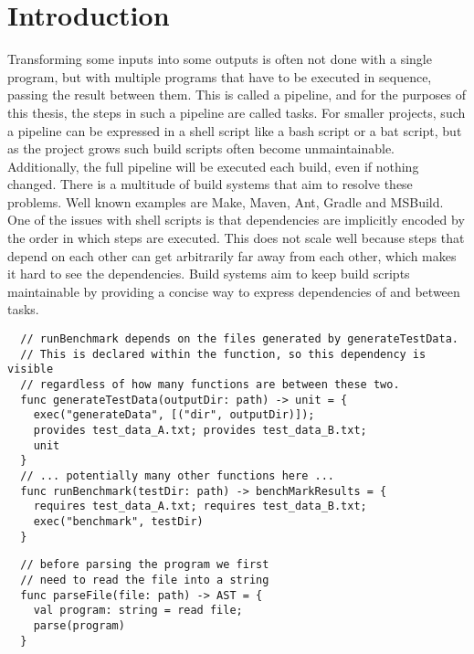 
\section{Introduction}
\label{sec:introduction}

Transforming some inputs into some outputs is often not done with a single program, but with multiple programs that have to be executed in sequence, passing the result between them.
This is called a pipeline, and for the purposes of this thesis, the steps in such a pipeline are called tasks.
For smaller projects, such a pipeline can be expressed in a shell script like a bash script or a bat script, but as the project grows such build scripts often become unmaintainable.\autocites{Hatch2018}{Moodie2006}
Additionally, the full pipeline will be executed each build, even if nothing changed.
There is a multitude of build systems that aim to resolve these problems.
Well known examples are Make, Maven, Ant, Gradle and MSBuild.\missingref
One of the issues with shell scripts is that dependencies are implicitly encoded by the order in which steps are executed.
This does not scale well because steps that depend on each other can get arbitrarily far away from each other, which makes it hard to see the dependencies.
Build systems aim to keep build scripts maintainable by providing a concise way to express dependencies of and between tasks.
\begin{lstlisting}
  // runBenchmark depends on the files generated by generateTestData.
  // This is declared within the function, so this dependency is visible
  // regardless of how many functions are between these two.
  func generateTestData(outputDir: path) -> unit = {
    exec("generateData", [("dir", outputDir)]);
    provides test_data_A.txt; provides test_data_B.txt;
    unit
  }
  // ... potentially many other functions here ...
  func runBenchmark(testDir: path) -> benchMarkResults = {
    requires test_data_A.txt; requires test_data_B.txt;
    exec("benchmark", testDir)
  }
\end{lstlisting}
\begin{lstlisting}
  // before parsing the program we first 
  // need to read the file into a string
  func parseFile(file: path) -> AST = {
    val program: string = read file;
    parse(program)
  }
\end{lstlisting}
